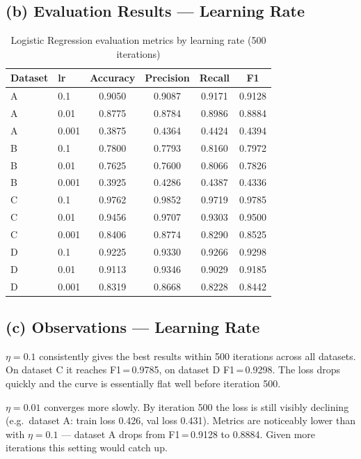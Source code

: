 \documentclass[11pt,a4paper]{article}
\begin{document}
\subsection{(b) Evaluation Results --- Learning Rate}

\begin{table}[H]
\centering
\caption{Logistic Regression evaluation metrics by learning rate (500 iterations)}
\label{tab:logreg_lr}
\begin{tabular}{llcccc}
\toprule
\textbf{Dataset} & \textbf{lr} & \textbf{Accuracy} & \textbf{Precision} & \textbf{Recall} & \textbf{F1} \\
\midrule
A & 0.1   & 0.9050 & 0.9087 & 0.9171 & 0.9128 \\
A & 0.01  & 0.8775 & 0.8784 & 0.8986 & 0.8884 \\
A & 0.001 & 0.3875 & 0.4364 & 0.4424 & 0.4394 \\
\midrule
B & 0.1   & 0.7800 & 0.7793 & 0.8160 & 0.7972 \\
B & 0.01  & 0.7625 & 0.7600 & 0.8066 & 0.7826 \\
B & 0.001 & 0.3925 & 0.4286 & 0.4387 & 0.4336 \\
\midrule
C & 0.1   & 0.9762 & 0.9852 & 0.9719 & 0.9785 \\
C & 0.01  & 0.9456 & 0.9707 & 0.9303 & 0.9500 \\
C & 0.001 & 0.8406 & 0.8774 & 0.8290 & 0.8525 \\
\midrule
D & 0.1   & 0.9225 & 0.9330 & 0.9266 & 0.9298 \\
D & 0.01  & 0.9113 & 0.9346 & 0.9029 & 0.9185 \\
D & 0.001 & 0.8319 & 0.8668 & 0.8228 & 0.8442 \\
\bottomrule
\end{tabular}
\end{table}

\subsection{(c) Observations --- Learning Rate}

$\eta = 0.1$ consistently gives the best results within 500 iterations across all datasets. On dataset C it reaches F1\,=\,0.9785, on dataset D F1\,=\,0.9298. The loss drops quickly and the curve is essentially flat well before iteration 500.

$\eta = 0.01$ converges more slowly. By iteration 500 the loss is still visibly declining (e.g.\ dataset A: train loss 0.426, val loss 0.431). Metrics are noticeably lower than with $\eta = 0.1$ --- dataset A drops from F1\,=\,0.9128 to 0.8884. Given more iterations this setting would catch up.
\end{document}
